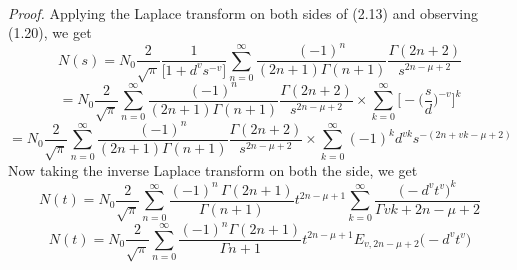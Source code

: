 \documentclass[leqno]{article}
\begin{document}
\vspace{0.05in}\\
%
\noindent
{\it Proof.}
Applying the Laplace transform on both sides of (2.13) and observing (1.20), we get
\begin{equation*}
    N(s)=N_0
    {\frac{2}{\sqrt{\pi}}}
    \frac{1}{\big[1+{d^v}{s^{-v}}\big]}
    \sum_{n = 0}^{\infty}
    \frac{(-1)^n}{(2n+1)\Gamma{(n+1)}}
    \frac{\Gamma{(2n+2)}}{s^{2n- \mu +2}}
\end{equation*}
\begin{equation*}
    =N_0
    {\frac{2}{\sqrt{\pi}}}
    \sum_{n = 0}^{\infty}
    \frac{(-1)^n}{(2n+1)\Gamma{(n+1)}}
    \frac{\Gamma{(2n+2)}}{s^{2n- \mu +2}}
    \times
    \sum_{k=0}^{\infty}
    \bigg[
        -{\bigg(\frac{s}{d}\bigg)^{-v}}
    \bigg]^k
\end{equation*}
\begin{equation*}
    =N_0
    {\frac{2}{\sqrt{\pi}}}
    \sum_{n = 0}^{\infty}
    \frac{(-1)^n}{(2n+1)\Gamma{(n+1)}}
    \frac{\Gamma{(2n+2)}}{s^{2n- \mu +2}}
    \times
    \sum_{k=0}^{\infty}
    (-1)^k{d^{vk}}{s^{-(2n+vk- \mu +2)}}
\end{equation*}
Now taking the inverse Laplace transform on both the side, we get
\begin{equation*}
    N(t)=N_0
    {\frac{2}{\sqrt{\pi}}}
    \sum_{n = 0}^{\infty}
    \frac{(-1)^n\,\Gamma{(2n+1)}}{\Gamma{(n+1)}}
    t^{2n-{\mu}+1}
    \sum_{k=0}^{\infty}
    \frac{\big(-{d^v}{t^v})^k}{\Gamma{vk+2n-\mu+2}}
\end{equation*}
\begin{equation*}
    N(t)=N_0
    {\frac{2}{\sqrt{\pi}}}
    \sum_{n = 0}^{\infty}
    \frac{(-1)^n\Gamma{(2n+1)}}{\Gamma{n+1}}
    t^{2n-{\mu}+1}
    E_{v, 2n-{\mu}+2}
    \big(-{d^v}{t^v})
\end{equation*}
\end{document}
